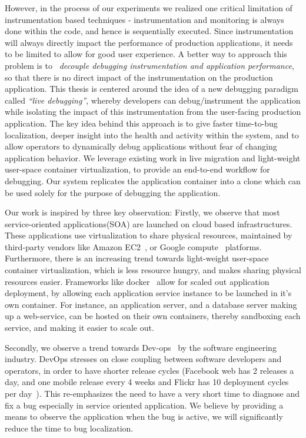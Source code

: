 However, in the process of our experiments we realized one critical limitation of instrumentation based techniques - instrumentation and monitoring is always done within the code, and hence is sequentially executed. 
Since instrumentation will always directly impact the performance of production applications, it needs to be limited to allow for good user experience.
A better way to approach this problem is to ~\emph{decouple debugging instrumentation and application performance}, so that there is no direct impact of the instrumentation on the production application.
This thesis is centered around the idea of a new debugging paradigm called \emph{``live debugging''}, whereby developers can debug/instrument the application while isolating the impact of this instrumentation from the user-facing production application.
The key idea behind this approach is to give faster time-to-bug localization, deeper insight into the health and activity within the system, and to allow operators to dynamically debug applications without fear of changing application behavior.
We leverage existing work in live migration and light-weight user-space container virtualization, to provide an end-to-end workflow for debugging.
Our system replicates the application container into a clone which can be used solely for the purpose of debugging the application.

Our work is inspired by three key observation: 
Firstly, we observe that most service-oriented applications(SOA) are launched on cloud based infrastructures.
These applications use virtualization to share physical resources, maintained by third-party vendors like Amazon EC2~\cite{ec2}, or Google compute~\cite{gcompute} platforms.
Furthermore, there is an increasing trend towards light-weight user-space container virtualization, which is less resource hungry, and makes sharing physical resources easier.
Frameworks like docker~\cite{docker} allow for scaled out application deployment, by allowing each application service instance to be launched in it's own container.
For instance, an application server, and a database server making up a web-service, can be hosted on their own containers, thereby sandboxing each service, and making it easier to scale out.

Secondly, we observe a trend towards Dev-ops~\cite{devops} by the software engineering industry.
DevOps stresses on close coupling between software developers and operators, in order to have shorter release cycles (Facebook web has 2 releases a day, and one mobile release every 4 weeks and Flickr has 10 deployment cycles per day~\cite{releaseFacebookKeynote,10DevOps}).
This re-emphasizes the need to have a very short time to diagnose and fix a bug especially in service oriented application.
We believe by providing a means to observe the application when the bug is active, we will significantly reduce the time to bug localization.

